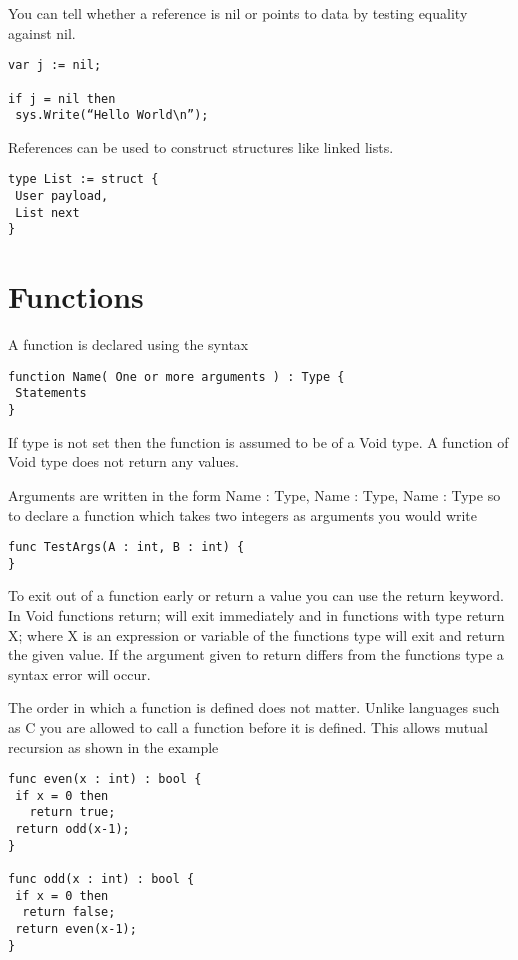 \documentclass[]{final_report}
\begin{document}
You can tell whether a reference is nil or points to data by testing equality against nil.

\begin{verbatim}
var j := nil; 

if j = nil then 
 sys.Write(“Hello World\n”);
\end{verbatim}

References can be used to construct structures like linked lists.

\begin{verbatim}
type List := struct {
 User payload,
 List next
}
\end{verbatim}


\section{Functions}

A function is declared using the syntax

\begin{verbatim}
function Name( One or more arguments ) : Type {
 Statements
}
\end{verbatim}

If type is not set then the function is assumed to be of a Void type. A function of Void type does not return any values.

Arguments are written in the form Name : Type, Name : Type, Name : Type so to declare a function which takes two integers as arguments you would write

\begin{verbatim}
func TestArgs(A : int, B : int) {
}
\end{verbatim}

To exit out of a function early or return a value you can use the return keyword. In Void functions return; will exit immediately and in functions with type return X; where X is an expression or variable of the functions type will exit and return the given value. If the argument given to return differs from the functions type a syntax error will occur.

The order in which a function is defined does not matter. Unlike languages such as C you are allowed to call a function before it is defined. This allows mutual recursion as shown in the example

\begin{verbatim}
func even(x : int) : bool {
 if x = 0 then 
   return true;
 return odd(x-1);
}

func odd(x : int) : bool {
 if x = 0 then 
  return false;
 return even(x-1);
}
\end{verbatim}
\end{document}
